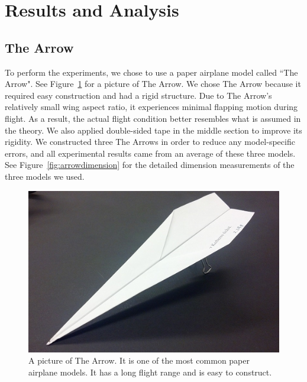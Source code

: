 \section{Results and Analysis}

\subsection{The Arrow}

To perform the experiments, we chose to use a paper airplane model called ``The Arrow". See Figure~\ref{fig:arrow} for a picture of The Arrow. 
We chose The Arrow because it required easy construction and had a rigid structure. Due to The Arrow's relatively small wing aspect ratio, it experiences minimal 
flapping motion during flight. As a result, the actual flight condition better resembles what is assumed in the theory. We also applied 
double-sided tape in the middle section to improve its rigidity. We constructed three The Arrows in order to reduce any model-specific
errors, and all experimental results came from an average of these three models. See Figure~\ref{fig:arrowdimension} for the detailed dimension measurements of the three models we used. 

\begin{figure}[hl]
  \centering
    \includegraphics[scale=0.6]{figures/arrow.png}
    \caption{A picture of The Arrow. It is one of the most common paper airplane models. It has a long flight range and 
		         is easy to construct.}
  \label{fig:arrow}
\end{figure}


